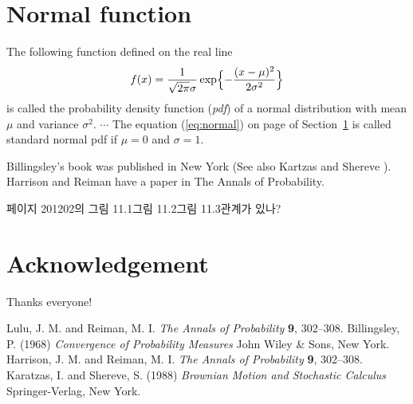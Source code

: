 \documentclass[11pt]{article}
\begin{document}
\tableofcontents
{}

\section[Normal real function]{Normal function} \label{ss:normal}
The following function defined on the real line
\begin{equation} \label{eq:normal}
f(x) = \frac{1}{\sqrt{2\pi}\sigma} \exp\Bigl\{-\frac{(x-\mu)^2}{2\sigma^2}\Bigr\}
\end{equation}
is called the probability density function (\emph{pdf}) of a normal distribution with mean $\mu$ and variance $\sigma^2$.
$\cdots$ The equation (\ref{eq:normal}) on page \pageref{eq:normal} of Section~\ref{ss:normal} is called standard \cite{Lulu} normal pdf if $\mu=0$ and $\sigma=1$.

Billingsley's \cite[see Cahpter~5]{bill1} book was published in New York (See also Kartzas and Shereve \cite[Optional]{KandS}). Harrison and Reiman \cite{HandR} have a paper in The Annals of Probability.

페이지 201\와 202의 그림 11.1\과 그림 11.2\는 그림 11.3\와 관계가 있나?

\section*{Acknowledgement}
Thanks everyone!

\begin{thebibliography}{12345}
 Lulu, J. M. and Reiman, M. I. \emph{The Annals of Probability} \textbf{9}, 302--308.
 Billingsley, P. (1968) \emph{Convergence of Probability Measures} John Wiley \& Sons, New York.
 Harrison, J. M. and Reiman, M. I. \emph{The Annals of Probability} \textbf{9}, 302--308.
 Karatzas, I. and Shereve, S. (1988) \emph{Brownian Motion and Stochastic Calculus} Springer-Verlag, New York.
\end{thebibliography}
 
 
\end{document}
